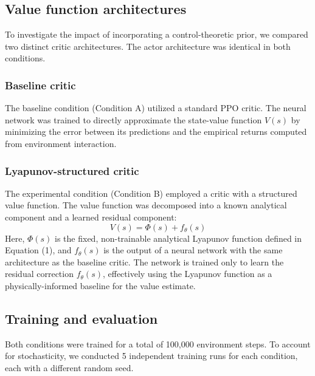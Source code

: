 \documentclass[]{article}
\begin{document}
\subsection{Value function architectures}
To investigate the impact of incorporating a control-theoretic prior, we compared two distinct critic architectures. The actor architecture was identical in both conditions.

\subsubsection{Baseline critic}
The baseline condition (Condition A) utilized a standard PPO critic. The neural network was trained to directly approximate the state-value function $V(s)$ by minimizing the error between its predictions and the empirical returns computed from environment interaction.

\subsubsection{Lyapunov-structured critic}
The experimental condition (Condition B) employed a critic with a structured value function. The value function was decomposed into a known analytical component and a learned residual component:
\begin{equation}
V(s) = \Phi(s) + f_\theta(s)
\end{equation}
Here, $\Phi(s)$ is the fixed, non-trainable analytical Lyapunov function defined in Equation (1), and $f_\theta(s)$ is the output of a neural network with the same architecture as the baseline critic. The network is trained only to learn the residual correction $f_\theta(s)$, effectively using the Lyapunov function as a physically-informed baseline for the value estimate.

\subsection{Training and evaluation}
Both conditions were trained for a total of 100,000 environment steps. To account for stochasticity, we conducted 5 independent training runs for each condition, each with a different random seed.
\end{document}
